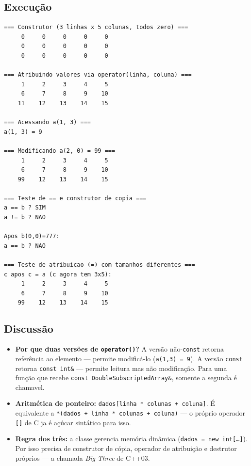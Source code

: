 \documentclass[11pt,a4paper]{article}
\begin{document}


\subsection*{Execu\c{c}\~ao}

\begin{saidabox}
\begin{lstlisting}[style=terminal]
=== Construtor (3 linhas x 5 colunas, todos zero) ===
     0     0     0     0     0
     0     0     0     0     0
     0     0     0     0     0

=== Atribuindo valores via operator(linha, coluna) ===
     1     2     3     4     5
     6     7     8     9    10
    11    12    13    14    15

=== Acessando a(1, 3) ===
a(1, 3) = 9

=== Modificando a(2, 0) = 99 ===
     1     2     3     4     5
     6     7     8     9    10
    99    12    13    14    15

=== Teste de == e construtor de copia ===
a == b ? SIM
a != b ? NAO

Apos b(0,0)=777:
a == b ? NAO

=== Teste de atribuicao (=) com tamanhos diferentes ===
c apos c = a (c agora tem 3x5):
     1     2     3     4     5
     6     7     8     9    10
    99    12    13    14    15
\end{lstlisting}
\end{saidabox}

\subsection*{Discuss\~ao}

\begin{itemize}[leftmargin=*]
  \item \textbf{Por que duas vers\~oes de \texttt{operator()}?} A vers\~ao n\~ao-\texttt{const} retorna refer\^encia ao elemento --- permite modific\'a-lo (\texttt{a(1,3) = 9}). A vers\~ao \texttt{const} retorna \texttt{const int\&} --- permite leitura mas n\~ao modifica\c{c}\~ao. Para uma fun\c{c}\~ao que recebe \texttt{const DoubleSubscriptedArray\&}, somente a segunda \'e chamavel.
  \item \textbf{Aritm\'etica de ponteiro:} \texttt{dados[linha * colunas + coluna]}. \'E equivalente a \texttt{*(dados + linha * colunas + coluna)} --- o pr\'oprio operador \texttt{[]} de C ja \'e a\c{c}\'ucar sint\'atico para isso.
  \item \textbf{Regra dos tr\^es:} a classe gerencia mem\'oria din\^amica (\texttt{dados = new int[\ldots]}). Por isso precisa de construtor de c\'opia, operador de atribui\c{c}\~ao e destrutor pr\'oprios --- a chamada \emph{Big Three} de C++03.
\end{itemize}
\end{document}
